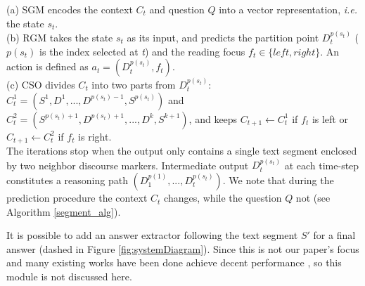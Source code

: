(a) SGM encodes the context $C_t$ and question $Q$ into a vector representation, \emph{i.e.} the state $s_t$.\\
(b) RGM takes the state $s_t$ as its input, and predicts the partition point $D^{p(s_t)}_t$ (${p(s_t)}$ is the index selected at \emph{t}) and the reading focus $f_t \in \{left, right\}$. An action is defined as $a_t=(D^{p(s_t)}_t,f_t)$. \\
(c) CSO divides $C_t$ into two parts from $D^{p(s_t)}_t$: $C^1_t=(S^1, D^1,...,D^{p(s_t)-1}, S^{p(s_t)})$ and $C^2_t=(S^{p(s_t)+1}, D^{p(s_t)+1},...,D^k, S^{k+1})$, and keeps $C_{t+1} \leftarrow C_{t}^{1}$ if $f_t$ is left or $C_{t+1} \leftarrow C_{t}^{2}$ if $f_t$ is right. \\
The iterations stop when the output only contains a single text segment enclosed by two neighbor discourse markers. Intermediate output $D^{p(s_t)}_t$ at each time-step constitutes a reasoning path $(D^{p(1)}_1,...,D^{p(s_t)}_t)$. We note that during the prediction procedure the context $C_t$ changes, while the question $Q$ not (see Algorithm \ref{segment_alg}).

It is possible to add an answer extractor following the text segment $S'$ for a final answer (dashed in Figure \ref{fig:systemDiagram}). Since this is not our paper's focus and many existing works have been done achieve decent performance \cite{DBLP:conf/ijcai/HuPHQW018}, so this module is not discussed here. %





